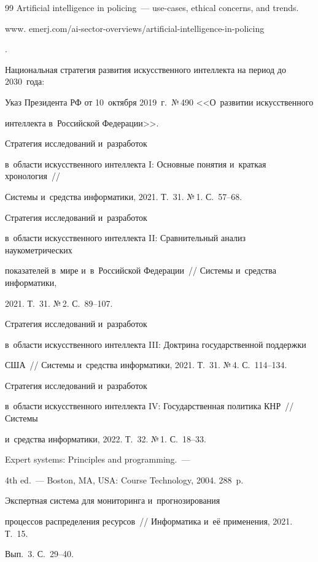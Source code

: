 {{\begin{thebibliography}{99}
Artificial intelligence in policing~--- use-cases, ethical concerns, and trends. {\sf  

www. emerj.com/ai-sector-overviews/artificial-intelligence-in-policing}.


Национальная стратегия развития искусственного интеллекта на период до 2030~года: 

Указ Президента РФ от 10~октября 2019~г.\ №\,490 <<О~развитии искусственного 

интеллекта в~Российской Федерации>>.


 Стратегия исследований и~разработок 

в~об\-ласти искусственного интеллекта I: Основные понятия и~краткая хронология~/\!\!/ 

Системы и~средства информатики, 2021. Т.~31. №\,1. С.~57--68.


 Стратегия исследований и~разработок 

в~об\-ласти искусственного интеллекта II: Сравнительный анализ наукометрических 

показателей в~мире и~в~Российской Федерации~/\!\!/ Системы и~средства информатики, 

2021. Т.~31. №\,2. С.~89--107.


 Стратегия исследований и~разработок 

в~об\-ласти искусственного интеллекта III: Доктрина государственной поддержки 

США~/\!\!/ Системы и~средства информатики, 2021. Т.~31. №\,4. С.~114--134.


 Стратегия исследований и~разработок 

в~об\-ласти искусственного интеллекта IV: Государственная политика КНР~/\!\!/ Системы 

и~средства информатики, 2022. Т.~32. №\,1. С.~18--33.


 Expert systems: Principles and programming.~---  

4th ed.~--- Boston, MA, USA: Course Technology, 2004. 288~p.


 Экспертная система для мониторинга и~прогнозирования 

процессов распределения ресурсов~/\!\!/ Информатика и~её применения, 2021. Т.~15. 

Вып.~3. С.~29--40.

       \end{thebibliography}

} }







